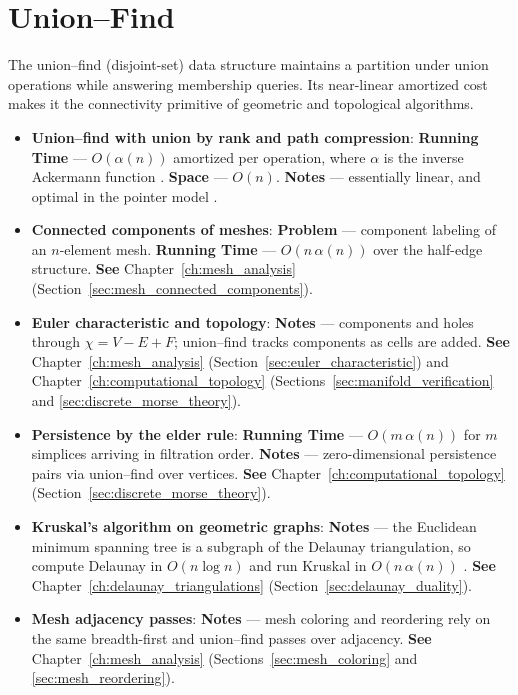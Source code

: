 \section{Union--Find}
\label{sec:app_alg_union_find}

The union--find (disjoint-set) data structure maintains a partition under
union operations while answering membership queries. Its near-linear
amortized cost makes it the connectivity primitive of geometric and
topological algorithms.

\begin{itemize}
  \item \textbf{Union--find with union by rank and path compression}:
    \textbf{Running Time} --- $O(\alpha(n))$ amortized per operation,
    where $\alpha$ is the inverse Ackermann function \cite{tarjan1975,
    cormen2009}. \textbf{Space} --- $O(n)$. \textbf{Notes} --- essentially
    linear, and optimal in the pointer model \cite{tarjan1975}.
  \item \textbf{Connected components of meshes}:
    \textbf{Problem} --- component labeling of an $n$-element mesh.
    \textbf{Running Time} --- $O(n\,\alpha(n))$ over the half-edge
    structure. \textbf{See} Chapter~\ref{ch:mesh_analysis}
    (Section~\ref{sec:mesh_connected_components}).
  \item \textbf{Euler characteristic and topology}:
    \textbf{Notes} --- components and holes through $\chi = V - E + F$;
    union--find tracks components as cells are added. \textbf{See}
    Chapter~\ref{ch:mesh_analysis} (Section~\ref{sec:euler_characteristic})
    and Chapter~\ref{ch:computational_topology}
    (Sections~\ref{sec:manifold_verification} and \ref{sec:discrete_morse_theory}).
  \item \textbf{Persistence by the elder rule}:
    \textbf{Running Time} --- $O(m\,\alpha(n))$ for $m$ simplices arriving
    in filtration order. \textbf{Notes} --- zero-dimensional persistence
    pairs via union--find over vertices. \textbf{See}
    Chapter~\ref{ch:computational_topology} (Section~\ref{sec:discrete_morse_theory}).
  \item \textbf{Kruskal's algorithm on geometric graphs}:
    \textbf{Notes} --- the Euclidean minimum spanning tree is a subgraph of
    the Delaunay triangulation, so compute Delaunay in $O(n\log n)$ and run
    Kruskal in $O(n\,\alpha(n))$ \cite{cormen2009}. \textbf{See}
    Chapter~\ref{ch:delaunay_triangulations} (Section~\ref{sec:delaunay_duality}).
  \item \textbf{Mesh adjacency passes}: \textbf{Notes} --- mesh coloring
    and reordering rely on the same breadth-first and union--find passes
    over adjacency. \textbf{See} Chapter~\ref{ch:mesh_analysis}
    (Sections~\ref{sec:mesh_coloring} and \ref{sec:mesh_reordering}).
\end{itemize}


